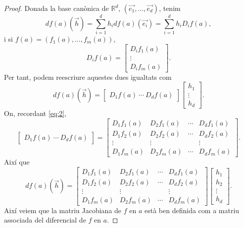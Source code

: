 \documentclass[../Apunts.tex]{subfiles}
\begin{document}
\begin{proposition}
\begin{proof}
			Donada la base canònica de \(\mathbb{R}^{d}\), \((\vec{e_{1}},\dots,\vec{e_{d}})\), tenim
			\[df(a)(\vec{h})=\sum_{i=1}^{d}h_{i}df(a)(\vec{e_{i}})=\sum_{i=1}^{d}h_{i}D_{i}f(a),\]
			i si \(f(a)=(f_{1}(a),\dots,f_{m}(a))\),
			\begin{equation}\label{eq:2}
			D_{i}f(a)=
			\left[\begin{matrix}
			D_{i}f_{1}(a)\\
			\vdots\\
			D_{i}f_{m}(a)
			\end{matrix}\right].
			\end{equation}
			Per tant, podem reescriure aquestes dues igualtats com
			\[df(a)(\vec{h})=
			\left[\begin{matrix}
			D_{1}f(a)~\cdots~D_{d}f(a)
			\end{matrix}\right]
			\left[\begin{matrix}
			h_{1}\\\vdots\\h_{d}
			\end{matrix}
			\right].\]
			On, recordant \eqref{eq:2},
			\[\left[\begin{matrix}
			D_{1}f(a)~\cdots~D_{d}f(a)
			\end{matrix}\right]=
			\left[\begin{matrix}
			D_{1}f_{1}(a) & D_{2}f_{1}(a) & \cdots & D_{d}f_{1}(a)\\
			D_{1}f_{2}(a) & D_{2}f_{2}(a) & \cdots & D_{d}f_{2}(a)\\
			\vdots & \vdots && \vdots \\
			D_{1}f_{m}(a) & D_{2}f_{m}(a) & \cdots & D_{d}f_{m}(a)
			\end{matrix}\right].\]
			Així que
			\[df(a)(\vec{h})=
			\left[\begin{matrix}
			D_{1}f_{1}(a) & D_{2}f_{1}(a) & \cdots & D_{d}f_{1}(a)\\
			D_{1}f_{2}(a) & D_{2}f_{2}(a) & \cdots & D_{d}f_{2}(a)\\
			\vdots & \vdots && \vdots \\
			D_{1}f_{m}(a) & D_{2}f_{m}(a) & \cdots & D_{d}f_{m}(a)
			\end{matrix}\right]
			\left[\begin{matrix}
			h_{1}\\h_{2}\\\vdots\\h_{d}
			\end{matrix}
			\right].\]
			Així veiem que la matriu Jacobiana de \(f\) en \(a\) està ben definida com a matriu associada del diferencial de \(f\) en \(a\).
		\end{proof}
	\end{proposition}
\end{document}
